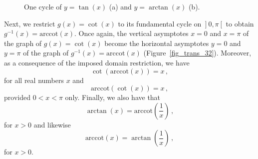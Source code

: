 \begin{figure}[h]
	\centering
	\centerline{
		\hspace{0.1cm}
	}
	\caption{One cycle of $y=\tan(x)$ (a) and $y=\arctan(x)$ (b).}
	\label{fig_trans_31}
\end{figure}


Next, we restrict $g(x) = \cot(x)$ to its fundamental cycle on $\left.\right]0,\pi\left[\right.$ to obtain $g^{-1}(x) = \mbox{arccot}(x)$.  Once again, the vertical asymptotes $x=0$ and $x=\pi$ of the graph of $g(x) = \cot(x)$ become the horizontal asymptotes $y = 0$ and $y = \pi$ of the graph of $g^{-1}(x) = \mbox{arccot}(x)$ (Figure~\ref{fig_trans_32}). Moreover, as a consequence of the imposed domain restriction, we have $$\cot\left(\mbox{arccot}(x)\right) = x\,,$$ for all real numbers $x$ and $$\mbox{arccot}(\cot(x)) = x\,,$$ provided $0 < x < \pi$ only. Finally, we also have that
$$
\arctan(x) = \mbox{arccot}\left(\frac{1}{x}\right)\,,
$$
for $x > 0$ and likewise
$$
\mbox{arccot}(x) =\arctan\left(\frac{1}{x}\right)\,,
$$
for $x > 0$.
 

